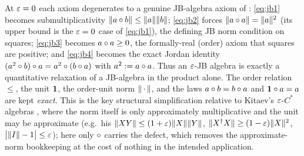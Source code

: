 \begin{remark}\label{rem:eps-jb-degeneration}
At $\varepsilon=0$ each axiom degenerates to a genuine JB-algebra axiom of
: \eqref{eq:jb1} becomes submultiplicativity
$\lVert a\circ b \rVert\le\lVert a \rVert\lVert b \rVert$; \eqref{eq:jb2} forces $\lVert a\circ a \rVert=\lVert a \rVert^2$
(its upper bound is the $\varepsilon=0$ case of \eqref{eq:jb1}), the defining JB norm
condition on squares; \eqref{eq:jb3} becomes $a\circ a\ge 0$, the formally-real
(order) axiom that squares are positive; and \eqref{eq:jb4} becomes the exact
Jordan identity $(a^2\circ b)\circ a=a^2\circ(b\circ a)$ with $a^2:=a\circ a$.
Thus an $\varepsilon$-JB algebra is exactly a quantitative relaxation of a JB-algebra
in the product alone. The order relation $\le$, the unit $\mathbf{1}$, the order-unit
norm $\lVert \,\cdot\, \rVert$, and the laws $a\circ b=b\circ a$ and $\mathbf{1}\circ a=a$ are kept
\emph{exact}. This is the key structural simplification relative to Kitaev's
$\varepsilon$-$C^*$ algebras \cite{Kitaev2024}, where the norm itself is only
approximately multiplicative and the unit may be approximate (e.g.\ his
$\lVert XY \rVert\le(1+\varepsilon)\lVert X \rVert\lVert Y \rVert$, $\lVert X^\dag X \rVert\ge(1-\varepsilon)\lVert X \rVert^2$,
$\bigl|\lVert I \rVert-1\bigr|\le\varepsilon$); here only $\circ$ carries the defect, which
removes the approximate-norm bookkeeping at the cost of nothing in the
intended application.
\end{remark}

